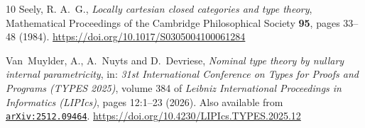 \documentclass[11pt,a4paper]{amsart}
\theoremstyle{plain}
\theoremstyle{definition}
\theoremstyle{remark}
\newcommand{\arxiv}[1]{\href{https://arxiv.org/abs/#1}{{\tt arXiv:#1}}}
\begin{document}
\begin{thebibliography}{10}
Seely, R. A.~G., \emph{Locally cartesian closed categories and type theory},
  Mathematical Proceedings of the Cambridge Philosophical Society \textbf{95},
  pages 33--48 (1984).
\newline\urlprefix\url{https://doi.org/10.1017/S0305004100061284}

Van~Muylder, A., A.~Nuyts and D.~Devriese, \emph{Nominal type theory by nullary
  internal parametricity}, in: \emph{31st International Conference on Types for
  Proofs and Programs (TYPES 2025)}, volume 384 of \emph{Leibniz International
  Proceedings in Informatics (LIPIcs)}, pages 12:1--23 (2026). Also available
  from \arxiv{2512.09464}.
\newline\urlprefix\url{https://doi.org/10.4230/LIPIcs.TYPES.2025.12}

\end{thebibliography}
\end{document}
